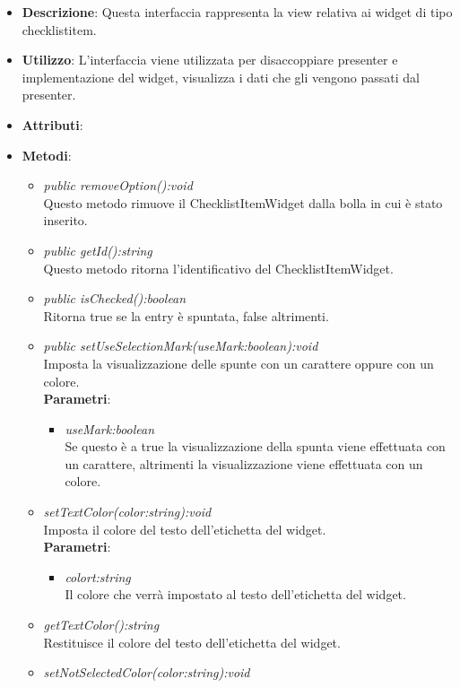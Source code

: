 \begin{itemize}
\item \textbf{Descrizione}: Questa interfaccia rappresenta la view relativa ai widget di tipo checklistitem.
\item \textbf{Utilizzo}: L'interfaccia viene utilizzata per disaccoppiare presenter e implementazione del widget, visualizza i dati che gli vengono passati dal presenter.
\item \textbf{Attributi}:
\item \textbf{Metodi}:
	\begin{itemize}
	\item \textit{public removeOption():void}\\
	Questo metodo rimuove il ChecklistItemWidget dalla bolla in cui è stato inserito.
	\item \textit{public getId():string}\\
	Questo metodo ritorna l'identificativo del ChecklistItemWidget.
	\item \textit{public isChecked():boolean}\\
	Ritorna true se la entry è spuntata, false altrimenti.
	\item \textit{public setUseSelectionMark(useMark:boolean):void}\\
	Imposta la visualizzazione delle spunte con un carattere oppure con un colore.
		\\ \textbf{Parametri}: \begin{itemize}
		\item \textit{useMark:boolean}\\
		Se questo è a true la visualizzazione della spunta viene effettuata con un carattere, altrimenti la visualizzazione viene effettuata con un colore.
		\end{itemize}  
		\item \textit{setTextColor(color:string):void}\\
		Imposta il colore del testo dell'etichetta del widget.
		\\ \textbf{Parametri}: \begin{itemize}
		\item \textit{colort:string}\\
		Il colore che verrà impostato al testo dell'etichetta del widget.
		\end{itemize}
		\item \textit{getTextColor():string}\\
		Restituisce il colore del testo dell'etichetta del widget.
		\item \textit{setNotSelectedColor(color:string):void}\\

\end{itemize}
\end{itemize}
